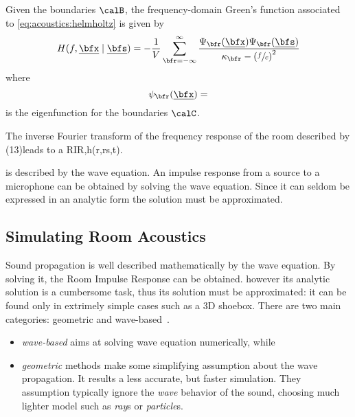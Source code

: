 
Given the boundaries $\calB$, the frequency-domain Green's function associated to \cref{eq:acoustics:helmholtz} is given by
\begin{equation}
    \label{eq:acoustics:greenBounded}
    H(f, \positionMicrophone \mid \positionSource) =
        - \frac{1}{V}
        \sum_{\pos=-\infty}^{\infty}
        \frac{\Psi_{\pos}(\positionMicrophone)\Psi_{\pos}(\positionSource)}{\kappa_{\pos} - \kparen{\sfrac{f}{c}}^2}
\end{equation}
where
\begin{equation}
    \psi_{\pos}(\positionMicrophone) =
\end{equation}
is the eigenfunction for the boundaries $\calC$.

The inverse Fourier transform of the frequency response of the room described by (13)leads to a RIR,h(r,rs,t).

 is described by the wave equation.
An impulse response from a source to a microphone can be obtained by solving the wave equation.
Since it can seldom be expressed in an analytic form the solution must be approximated.

\subsection{Simulating Room Acoustics}
Sound propagation is well described mathematically by the wave equation.
By solving it, the Room Impulse Response can be obtained.
however its analytic solution is a cumbersome task, thus its solution must be approximated: it can be found only in extrimely
simple cases such as a 3D shoebox.
There are two main categories: geometric and wave-based~\cite{Habets2010generator, reuk.github.io, Savioja2015goemetric}.
\begin{itemize}
    \item \textit{wave-based} aims at solving wave equation numerically, while
    \item \textit{geometric} methods make some simplifying assumption about the wave propagation.
    It results a less accurate, but faster simulation.
    They assumption typically ignore the \textit{wave} behavior of the sound, choosing much lighter model such as \textit{ray}s or \textit{particle}s.
\end{itemize}

